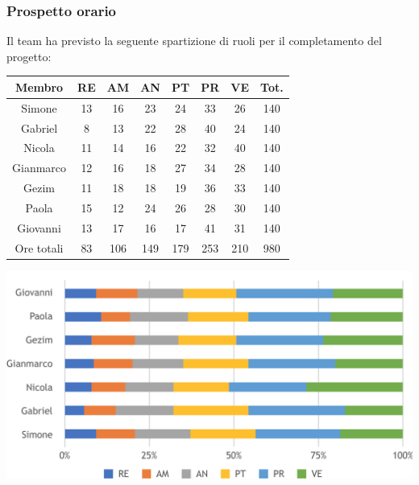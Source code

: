 \subsubsection{Prospetto orario}
Il team ha previsto la seguente spartizione di ruoli per il completamento del progetto:
\\
\begin{center}
\begin{tabular}{ |c|c|c|c|c|c|c|c|  }
 \hline
 Membro 		& RE 		& AM 		& AN 	& PT 	& PR 	& VE 	& Tot.\\
 \hline\hline
 Simone			& 13 		& 16			& 23 		& 24 		& 33 		& 26 		& 140\\
 Gabriel		& 8 			& 13 		& 22 		& 28		& 40 		& 24 		& 140\\
 Nicola			& 11 		& 14 		& 16 		& 22 		& 32 		& 40 		& 140\\
 Gianmarco		& 12 		& 16 		& 18 		& 27	 	& 34 		& 28 		& 140\\
 Gezim			& 11 		& 18 		& 18 		& 19 		& 36 		& 33	 	& 140\\
 Paola			& 15 		& 12 		& 24 		& 26 		& 28 		& 30 		& 140\\
 Giovanni		& 13 		& 17	 		& 16 		& 17 		& 41	 	& 31  		& 140\\
 \hline\hline
 Ore totali		& 83 	& 106		& 149 	& 179 	& 253 	& 210 	& 980\\
  \hline
\end{tabular}
\end{center}
\includegraphics[width=\textwidth]{res/img/hip3}
\\
